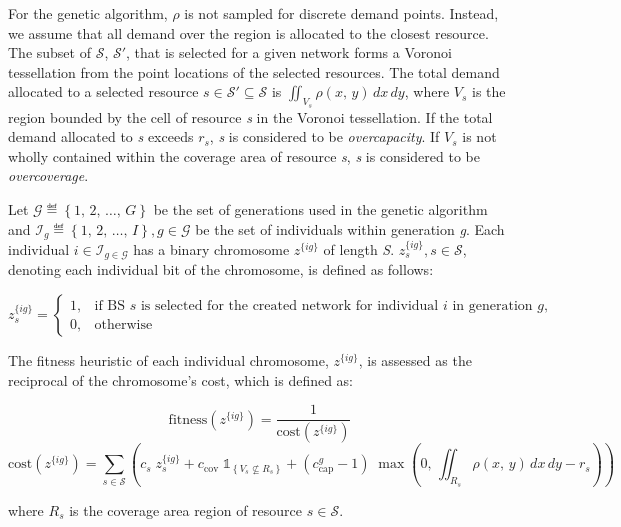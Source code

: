 \documentclass[onecolumn,draftcls]{IEEEtran}
\begin{document}
For the genetic algorithm, $\rho$ is not sampled for discrete demand points.  Instead, we assume that all demand over the region is allocated to the closest resource.  The subset of $\mathcal{S}$, $\mathcal{S}'$, that is selected for a given network forms a Voronoi tessellation from the point locations of the selected resources.  The total demand allocated to a selected resource $s \in \mathcal{S}' \subseteq \mathcal{S}$ is $\iint_{V_s} \rho\left(x,\, y\right) \,dx \,dy$, where $V_s$ is the region bounded by the cell of resource \textit{s} in the Voronoi tessellation.  If the total demand allocated to \textit{s} exceeds $r_s$, \textit{s} is considered to be \textit{overcapacity}.  If $V_s$ is not wholly contained within the coverage area of resource \textit{s}, \textit{s} is considered to be \textit{overcoverage}.

Let $\mathcal{G} \eqdef \left\{1,\, 2,\, \ldots,\, G\right\}$ be the set of generations used in the genetic algorithm and $\mathcal{I}_g \eqdef \left\{1,\, 2,\, \ldots,\, I\right\}, g \in \mathcal{G}$ be the set of individuals within generation \textit{g}.  Each individual $i \in \mathcal{I}_{g \in \mathcal{G}}$ has a binary chromosome $z^{\{ig\}}$ of length \textit{S}.  $z_s^{\{ig\}}, s \in \mathcal{S}$, denoting each individual bit of the chromosome, is defined as follows:

\[ z_s^{\{ig\}} =
	\begin{cases}
		1,& \text{if BS $s$ is selected for the created network for individual $i$ in generation $g$,}\\
		0,& \text{otherwise}
	\end{cases}
\]

The fitness heuristic of each individual chromosome, $z^{\{ig\}}$, is assessed as the reciprocal of the chromosome's cost, which is defined as:

\begin{equation} \label{eq:GAFit}
\text{fitness}\left(z^{\{ig\}}\right) = \frac{1}{\text{cost}\left(z^{\{ig\}}\right)}
\end{equation}
\begin{equation} \label{eq:GACost}
\text{cost}\left(z^{\{ig\}}\right) = \sum_{s \in \mathcal{S}} \left( c_s \; z_s^{\{ig\}} + c_\text{cov} \; \mathbb{1}_{\left\{ V_s \nsubseteq R_s \right\}} + \left(c_\text{cap}^g - 1\right) \; \max\left( 0,\, \iint_{R_s} \rho\left(x,\, y\right)\, dx\, dy - r_s \right) \right)
\end{equation}

\noindent where $R_s$ is the coverage area region of resource $s \in \mathcal{S}$.
\end{document}
